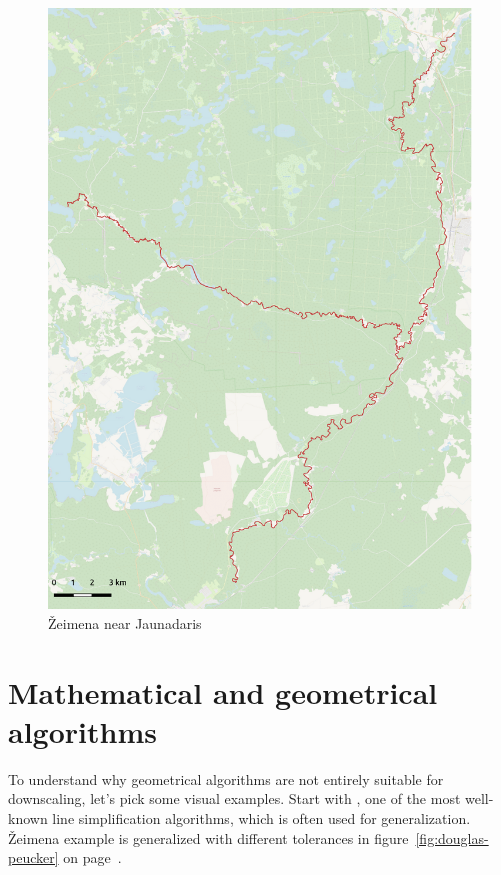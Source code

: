 \documentclass{article}
\begin{document}
\begin{figure}
    \centering
    \includegraphics[width=148mm]{zeimena-pretty}
    \caption{Žeimena near Jaunadaris}
    \label{fig:zeimena}
\end{figure}

\section{Mathematical and geometrical algorithms}

To understand why geometrical algorithms are not entirely suitable for 
downscaling, let's pick some visual examples. Start with
\cite{douglas1973algorithms}, one of the most well-known line simplification
algorithms, which is often used for generalization. Žeimena example is
generalized with different tolerances in figure~\ref{fig:douglas-peucker} on
page~\pageref{fig:douglas-peucker}.
\end{document}
